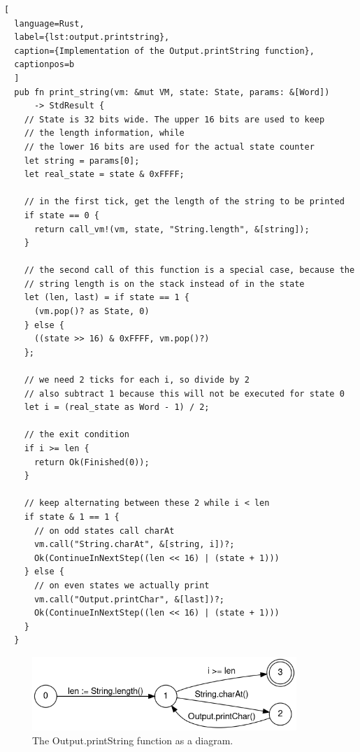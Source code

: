 \begin{lstlisting}[
  language=Rust,
  label={lst:output.printstring},
  caption={Implementation of the Output.printString function},
  captionpos=b
  ]
  pub fn print_string(vm: &mut VM, state: State, params: &[Word])
      -> StdResult {
    // State is 32 bits wide. The upper 16 bits are used to keep
    // the length information, while
    // the lower 16 bits are used for the actual state counter
    let string = params[0];
    let real_state = state & 0xFFFF;

    // in the first tick, get the length of the string to be printed
    if state == 0 {
      return call_vm!(vm, state, "String.length", &[string]);
    }

    // the second call of this function is a special case, because the
    // string length is on the stack instead of in the state
    let (len, last) = if state == 1 {
      (vm.pop()? as State, 0)
    } else {
      ((state >> 16) & 0xFFFF, vm.pop()?)
    };

    // we need 2 ticks for each i, so divide by 2
    // also subtract 1 because this will not be executed for state 0
    let i = (real_state as Word - 1) / 2;

    // the exit condition
    if i >= len {
      return Ok(Finished(0));
    }

    // keep alternating between these 2 while i < len
    if state & 1 == 1 {
      // on odd states call charAt
      vm.call("String.charAt", &[string, i])?;
      Ok(ContinueInNextStep((len << 16) | (state + 1)))
    } else {
      // on even states we actually print
      vm.call("Output.printChar", &[last])?;
      Ok(ContinueInNextStep((len << 16) | (state + 1)))
    }
  }
\end{lstlisting}
\begin{center}
  \begin{figure}[ht]
    \centering
    \includegraphics[width=10cm]{fig/printString.png}
    \caption{The Output.printString function as a diagram.}
    \label{fig:printstring-dfa}
  \end{figure}
\end{center}

